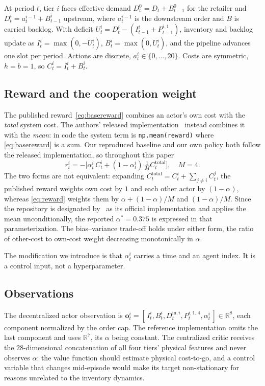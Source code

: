 \documentclass[conference]{IEEEtran}
\begin{document}
At period $t$, tier $i$ faces effective demand $D_t^0 = D_t + B_{t-1}^0$
for the retailer and $D_t^i = a_t^{i-1} + B_{t-1}^i$ upstream, where
$a_t^{i-1}$ is the downstream order and $B$ is carried backlog. With
deficit $U_t^i = D_t^i - (I_{t-1}^i + P_{t-1}^{i,1})$, inventory and
backlog update as $I_t^i = \max(0,-U_t^i)$, $B_t^i = \max(0,U_t^i)$, and
the pipeline advances one slot per period. Actions are discrete,
$a_t^i \in \{0,\dots,20\}$. Costs are symmetric, $h=b=1$, so
$C_t^i = I_t^i + B_t^i$.

\subsection{Reward and the cooperation weight}
The published reward~\eqref{eq:basereward} combines an actor's own cost
with the \emph{total} system cost. The authors' released
implementation~\cite{liu2022code} instead combines it with the
\emph{mean}: in code the system term is \texttt{np.mean(reward)} where
\eqref{eq:basereward} is a sum. Our reproduced baseline and our own policy
both follow the released implementation, so throughout this paper
\begin{equation}
r_t^i = -\Big[\alpha_t^i\, C_t^i + (1-\alpha_t^i)\,\tfrac{1}{M} C_t^{\text{total}}\Big],
\quad M = 4 .
\label{eq:reward}
\end{equation}
The two forms are not equivalent: expanding
$C_t^{\text{total}} = C_t^i + \sum_{j \neq i} C_t^j$, the published reward
weights own cost by $1$ and each other actor by $(1-\alpha)$, whereas
\eqref{eq:reward} weights them by $\alpha + (1-\alpha)/M$ and
$(1-\alpha)/M$. Since the repository is designated by~\cite{liu2022} as its
official implementation and applies the mean unconditionally, the reported
$\alpha^{\ast}=0.375$ is expressed in that parameterization. The
bias--variance trade-off holds under either form, the ratio of other-cost to
own-cost weight decreasing monotonically in $\alpha$.

The modification we introduce is that $\alpha_t^i$ carries a time and an
agent index. It is a control input, not a hyperparameter.

\subsection{Observations}
The decentralized actor observation is
$\mathbf{o}_t^i = [\,I_t^i, B_t^i, D_t^{\text{in},i}, P_t^{i,1..4},
\alpha_t^i\,] \in \mathbb{R}^8$, each component normalized by the order
cap. The reference implementation omits the last component and uses
$\mathbb{R}^7$, its $\alpha$ being constant. The centralized critic receives the
$28$-dimensional concatenation of all four tiers' physical features and
never observes $\alpha$: the value function should estimate physical
cost-to-go, and a control variable that changes mid-episode would make its
target non-stationary for reasons unrelated to the inventory dynamics.
\end{document}
